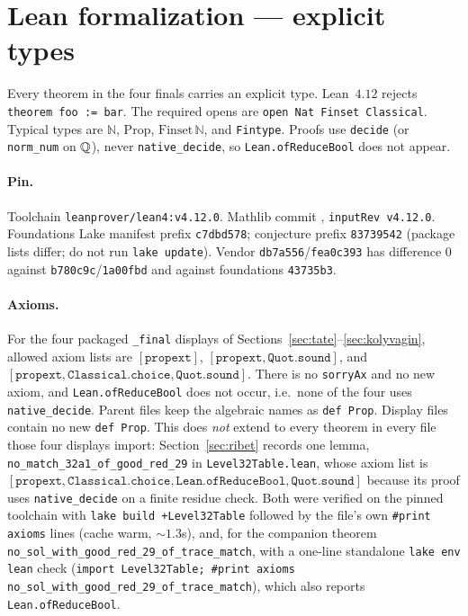 \section{Lean formalization --- explicit types}\label{sec:formal}

Every theorem in the four finals carries an explicit type. Lean~$4.12$
rejects \texttt{theorem foo := bar}. The required opens are
\texttt{open Nat Finset Classical}. Typical types are
$\mathbb{N}$, $\mathrm{Prop}$, $\mathrm{Finset}\,\mathbb{N}$, and
\texttt{Fintype}. Proofs use \texttt{decide} (or \texttt{norm\_num}
on $\mathbb{Q}$), never \texttt{native\_decide}, so
\texttt{Lean.ofReduceBool} does not appear.

\paragraph{Pin.}
Toolchain \texttt{leanprover/lean4:v4.12.0}. Mathlib commit
,
\texttt{inputRev v4.12.0}. Foundations Lake manifest prefix
\texttt{c7dbd578}; conjecture prefix \texttt{83739542}
(package lists differ; do not run \texttt{lake update}). Vendor
\texttt{db7a556}/\texttt{fea0c393} has difference $0$ against
\texttt{b780c9c}/\texttt{1a00fbd} and against foundations
\texttt{43735b3}.

\paragraph{Axioms.}
For the four packaged \texttt{\_final} displays of
Sections~\ref{sec:tate}--\ref{sec:kolyvagin}, allowed axiom lists
are $[\mathtt{propext}]$,
$[\mathtt{propext},\mathtt{Quot.sound}]$, and
$[\mathtt{propext},\mathtt{Classical.choice},\mathtt{Quot.sound}]$.
There is no \texttt{sorryAx} and no new axiom, and
\texttt{Lean.ofReduceBool} does not occur, i.e.\ none of the four
uses \texttt{native\_decide}. Parent files keep the algebraic names
as \texttt{def Prop}. Display files contain no new \texttt{def Prop}.
This does \emph{not} extend to every theorem in every file those
four displays import: Section~\ref{sec:ribet} records one lemma,
\texttt{no\_match\_32a1\_of\_good\_red\_29} in
\texttt{Level32Table.lean}, whose axiom list is
$[\mathtt{propext},\mathtt{Classical.choice},\mathtt{Lean.ofReduceBool},
\mathtt{Quot.sound}]$ because its proof uses \texttt{native\_decide}
on a finite residue check. Both were verified on the pinned
toolchain with
\texttt{lake build +Level32Table} followed by the file's own
\texttt{\#print axioms} lines (cache warm, $\sim 1.3$s), and,
for the companion theorem
\texttt{no\_sol\_with\_good\_red\_29\_of\_trace\_match}, with a
one-line standalone \texttt{lake env lean} check
(\texttt{import Level32Table; \#print axioms
no\_sol\_with\_good\_red\_29\_of\_trace\_match}), which also
reports \texttt{Lean.ofReduceBool}.

